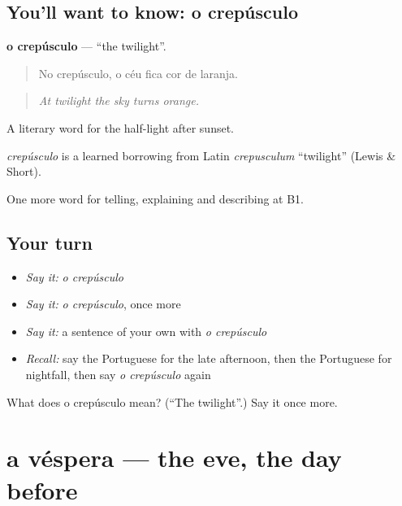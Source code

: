 \subsection*{You'll want to know: o crepúsculo}
\textbf{o crepúsculo} — \textquotedblleft{}the twilight\textquotedblright{}.

\begin{quote}
No crepúsculo, o céu fica cor de laranja.
\end{quote}

\begin{quote}
\emph{At twilight the sky turns orange.}
\end{quote}

A literary word for the half-light after sunset.

\begin{cousinweb}
\emph{crepúsculo} is a learned borrowing from Latin \emph{crepusculum} \textquotedblleft{}twilight\textquotedblright{} (Lewis \& Short).
\end{cousinweb}

\begin{grammarlens}[title={What you've built}]
One more word for telling, explaining and describing at B1.
\end{grammarlens}

\subsection*{Your turn}
\begin{itemize}
\raggedright
  \item \emph{Say it:} \emph{o crepúsculo}
  \item \emph{Say it:} \emph{o crepúsculo}, once more
  \item \emph{Say it:} a sentence of your own with \emph{o crepúsculo}
  \item \emph{Recall:} say the Portuguese for the late afternoon, then the Portuguese for nightfall, then say \emph{o crepúsculo} again
\end{itemize}

\begin{tcolorbox}[breakable,colback=teal!4,colframe=teal!35!black,title={Before you move on}]
What does o crepúsculo mean? (\textquotedblleft{}The twilight\textquotedblright{}.) Say it once more.
\end{tcolorbox}
\section[a véspera]{a véspera — the eve, the day before}


